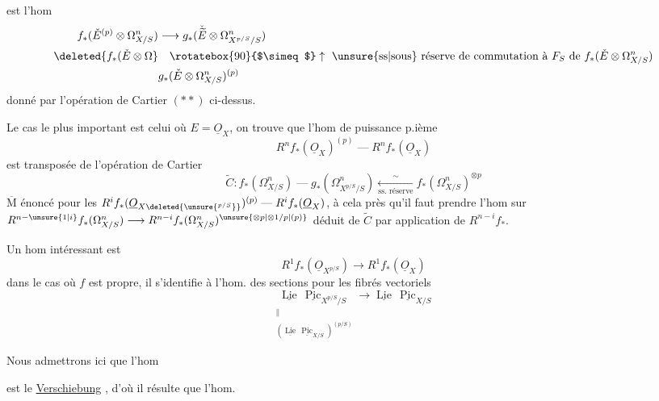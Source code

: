 est l'hom
\[
\begin{aligned}
f_*(\check E^{(p)}\otimes\Omega^n_{X/S})&\longrightarrow
 g_*(\check{\widetilde E}\otimes\Omega^n_{X^{p/S}/S})\\
\deleted{f_*(\check E\otimes\Omega}&
 \quad\rotatebox{90}{$\simeq$}\uparrow\ \text{\unsure{ss|sous} réserve de commutation à $F_S$ de $f_*(\check E\otimes\Omega^n_{X/S})$}\\
&g_*(\check E\otimes\Omega^n_{X/S})^{(p)}
\end{aligned}
\]
donné par l'opération de Cartier $(\ast\ast)$ ci-dessus.

Le cas le plus important est celui où $E=\underline O_X$, on trouve que l'hom de puissance p.ième
\[
 R^nf_*(\underline O_X)^{(p)}\mathrel{\text{---}}R^nf_*(\underline O_X)
\]
est transposée de l'opération de Cartier
\[
 \widetilde C:f_*(\Omega^n_{X/S})\mathrel{\text{---}}g_*(\Omega^n_{X^{p/S}/S})
 \mathrel{\underset{\text{ss. réserve}}{\overset{\sim}{\longleftarrow}}}
 f_*(\Omega^n_{X/S})^{\otimes p}
\]
$\overline{\mathrm M}$ énoncé pour les $R^if_*(\underline O_{X\deleted{\unsure{{}^{p/S}}}})^{(p)}\mathrel{\text{---}}R^if_*(\underline O_X)$,  à cela près qu'il faut prendre l'hom sur $R^{n-\unsure{1|i}}f_*(\Omega^n_{X/S})\longrightarrow R^{n-i}f_*(\Omega^n_{X/S})^{\unsure{\otimes p|\otimes1/p|(p)}}$  déduit de $\widetilde C$ par application de $R^{n-i}f_*$.

Un hom intéressant est
\[
 R^1f_*(\underline O_{X^{p/S}})\longrightarrow R^1f_*(\underline O_X)
\]
dans le cas où $f$ est propre,   il s'identifie à l'hom. des sections pour les fibrés vectoriels
\[
 \underset{\substack{\parallel\\(\underline{\operatorname{Lie}}\,\underline{\operatorname{Pic}}_{X/S})^{(p/S)}}}
 {\underline{\operatorname{Lie}}\,\underline{\operatorname{Pic}}_{X^{p/S}/S}}
 \longrightarrow\underline{\operatorname{Lie}}\,\underline{\operatorname{Pic}}_{X/S}
\]

Nous admettrons ici que  l'hom 

est le \uline{Verschiebung} , d'où il résulte que l'hom.

